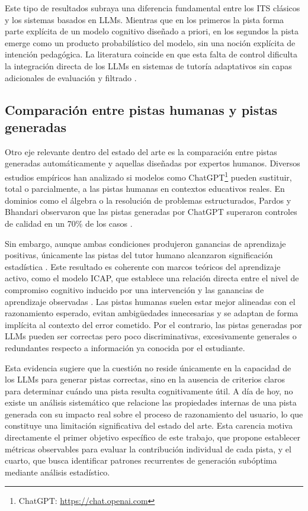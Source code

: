 \documentclass[../main.tex]{subfiles}
\begin{document}
Este tipo de resultados subraya una diferencia fundamental entre los ITS clásicos y los sistemas basados en LLMs. Mientras que en los primeros la pista forma parte explícita de un modelo cognitivo diseñado a priori, en los segundos la pista emerge como un producto probabilístico del modelo, sin una noción explícita de intención pedagógica. La literatura coincide en que esta falta de control dificulta la integración directa de los LLMs en sistemas de tutoría adaptativos sin capas adicionales de evaluación y filtrado \cite{Kaliszyk2023PromiseLimits, Scarlatos2024FeedbackRL}.

\subsection{Comparación entre pistas humanas y pistas generadas}

Otro eje relevante dentro del estado del arte es la comparación entre pistas generadas automáticamente y aquellas diseñadas por expertos humanos. Diversos estudios empíricos han analizado si modelos como ChatGPT\footnote{ChatGPT: \url{https://chat.openai.com}} pueden sustituir, total o parcialmente, a las pistas humanas en contextos educativos reales. En dominios como el álgebra o la resolución de problemas estructurados, Pardos y Bhandari observaron que las pistas generadas por ChatGPT superaron controles de calidad en un 70\% de los casos \cite{Li2023HumanAIGeneratedHints}.

Sin embargo, aunque ambas condiciones produjeron ganancias de aprendizaje positivas, únicamente las pistas del tutor humano alcanzaron significación estadística \cite{Li2023HumanAIGeneratedHints}. Este resultado es coherente con marcos teóricos del aprendizaje activo, como el modelo ICAP, que establece una relación directa entre el nivel de compromiso cognitivo inducido por una intervención y las ganancias de aprendizaje observadas \cite{Chi2018ActiveLearning}. Las pistas humanas suelen estar mejor alineadas con el razonamiento esperado, evitan ambigüedades innecesarias y se adaptan de forma implícita al contexto del error cometido. Por el contrario, las pistas generadas por LLMs pueden ser correctas pero poco discriminativas, excesivamente generales o redundantes respecto a información ya conocida por el estudiante.

Esta evidencia sugiere que la cuestión no reside únicamente en la capacidad de los LLMs para generar pistas correctas, sino en la ausencia de criterios claros para determinar cuándo una pista resulta cognitivamente útil. A día de hoy, no existe un análisis sistemático que relacione las propiedades internas de una pista generada con su impacto real sobre el proceso de razonamiento del usuario, lo que constituye una limitación significativa del estado del arte. Esta carencia motiva directamente el primer objetivo específico de este trabajo, que propone establecer métricas observables para evaluar la contribución individual de cada pista, y el cuarto, que busca identificar patrones recurrentes de generación subóptima mediante análisis estadístico.
\end{document}
